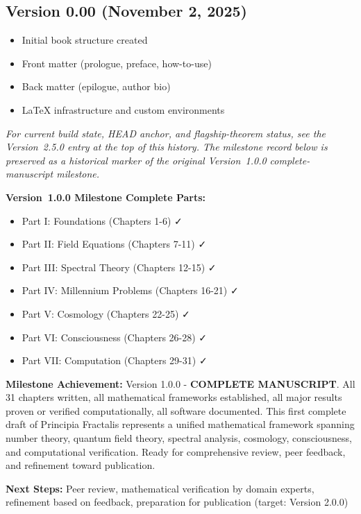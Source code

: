 \subsection*{Version 0.00 (November 2, 2025)}
\begin{itemize}
\item Initial book structure created
\item Front matter (prologue, preface, how-to-use)
\item Back matter (epilogue, author bio)
\item LaTeX infrastructure and custom environments
\end{itemize}

\vspace{2cm}

\noindent\textit{For current build state, HEAD anchor, and flagship-theorem
status, see the Version~2.5.0 entry at the top of this history. The
milestone record below is preserved as a historical marker of the
original Version~1.0.0 complete-manuscript milestone.}

\vspace{0.5cm}

\noindent\textbf{Version~1.0.0 Milestone Complete Parts:}
\begin{itemize}
\item Part I: Foundations (Chapters 1-6) ✓
\item Part II: Field Equations (Chapters 7-11) ✓
\item Part III: Spectral Theory (Chapters 12-15) ✓
\item Part IV: Millennium Problems (Chapters 16-21) ✓
\item Part V: Cosmology (Chapters 22-25) ✓
\item Part VI: Consciousness (Chapters 26-28) ✓
\item Part VII: Computation (Chapters 29-31) ✓
\end{itemize}

\noindent\textbf{Milestone Achievement:} Version 1.0.0 - \textbf{COMPLETE MANUSCRIPT}. All 31 chapters written, all mathematical frameworks established, all major results proven or verified computationally, all software documented. This first complete draft of Principia Fractalis represents a unified mathematical framework spanning number theory, quantum field theory, spectral analysis, cosmology, consciousness, and computational verification. Ready for comprehensive review, peer feedback, and refinement toward publication.

\noindent\textbf{Next Steps:} Peer review, mathematical verification by domain experts, refinement based on feedback, preparation for publication (target: Version 2.0.0)

\endgroup
